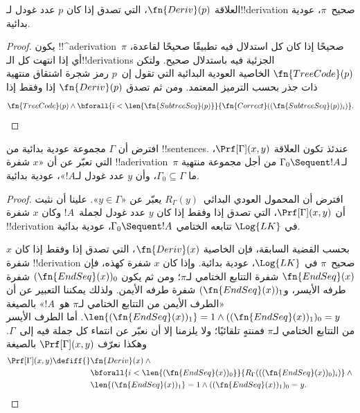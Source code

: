 \documentclass[../../../include/open-logic-section]{subfiles}
\begin{document}
\begin{prop}
  العلاقة $\fn{Deriv}(p)$، التي تصدق إذا كان $p$ عدد غودل
  لـ!!{derivation} صحيح~$\pi$، عودية بدائية.
\end{prop}

\begin{proof}
  يكون !!^a{derivation}~$\pi$ صحيحًا إذا كان كل استدلال فيه تطبيقًا
  صحيحًا لقاعدة، أي إذا انتهت كل الـ!!{derivation}s الجزئية فيه باستدلال
  صحيح. ولتكن $\fn{TreeCode}(p)$ الخاصية العودية البدائية التي تقول
  إن~$p$ رمز شجرة اشتقاق منتهية ذات جذر بحسب الترميز المعتمد. ومن ثم
  تصدق $\fn{Deriv}(p)$ إذا وفقط إذا
  \[
  \fn{TreeCode}(p) \land
  \bforall{i<\len{\fn{SubtreeSeq}(p)}}{\fn{Correct}((\fn{SubtreeSeq}(p))_i)}.
  \]
\end{proof}


\begin{prop}
افترض أن $\Gamma$ مجموعة عودية بدائية من !!{sentence}s. عندئذ تكون
العلاقة $\Prf[\Gamma](x,y)$، التي تعبّر عن أن «$x$ شفرة
!!a{derivation}~$\pi$ لـ$\Gamma_0 \Sequent !A$ من أجل مجموعة منتهية ما
$\Gamma_0\subseteq\Gamma$، وأن $y$ عدد غودل لـ$!A$»، عودية بدائية.
\end{prop}

\begin{proof}
افترض أن المحمول العودي البدائي~$R_\Gamma(y)$ يعبّر عن
«$y\in\Gamma$». علينا أن نثبت أن $\Prf[\Gamma](x,y)$، التي تصدق إذا
وفقط إذا كان $y$ عدد غودل لجملة~$!A$ وكان $x$ شفرة !!{derivation} في
$\Log{LK}$ تتابعه الختامي $\Gamma_0 \Sequent !A$، عودية بدائية.

بحسب القضية السابقة، فإن الخاصية $\fn{Deriv}(x)$، التي تصدق إذا وفقط
إذا كان $x$ شفرة !!{derivation} صحيح~$\pi$ في $\Log{LK}$، عودية
بدائية. وإذا كان $x$ شفرة كهذه، فإن $\fn{EndSeq}(x)$ شفرة التتابع
الختامي لـ$\pi$؛ ومن ثم يكون $(\fn{EndSeq}(x))_0$ شفرة طرفه الأيسر،
و$(\fn{EndSeq}(x))_1$ شفرة طرفه الأيمن. ولذلك يمكننا التعبير عن أن
«الطرف الأيمن من التتابع الختامي لـ$\pi$ هو~$!A$» بالصيغة
$\len{(\fn{EndSeq}(x))_1}=1 \land ((\fn{EndSeq}(x))_1)_0=y$. أما الطرف
الأيسر من التتابع الختامي لـ$\pi$ فمنتهٍ تلقائيًا؛ ولا يلزمنا إلا أن
نعبّر عن انتماء كل جملة فيه إلى~$\Gamma$. وهكذا نعرّف
$\Prf[\Gamma](x,y)$ بالصيغة
\begin{align*}
\Prf[\Gamma](x, y) \defiff {}&
\fn{Deriv}(x) \land {} \\
& \bforall{i <
  \len{(\fn{EndSeq}(x))_0}}{R_\Gamma(((\fn{EndSeq}(x))_0)_i)} \land {}\\
& \len{(\fn{EndSeq}(x))_1} = 1 \land ((\fn{EndSeq}(x))_1)_0 = y.
\end{align*}
\end{proof}
\end{document}
